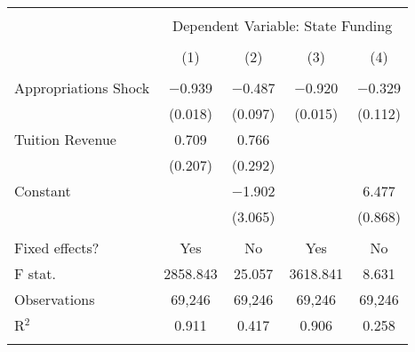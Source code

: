 
\begin{tabular}{@{\extracolsep{5pt}}lcccc} 
\\[-1.8ex]\hline 
\hline \\[-1.8ex] 
 & \multicolumn{4}{c}{Dependent Variable: State Funding} \\ 
\cline{2-5} 
\\[-1.8ex] & (1) & (2) & (3) & (4)\\ 
\hline \\[-1.8ex] 
 Appropriations Shock & $-$0.939 & $-$0.487 & $-$0.920 & $-$0.329 \\ 
  & (0.018) & (0.097) & (0.015) & (0.112) \\ 
  Tuition Revenue & 0.709 & 0.766 &  &  \\ 
  & (0.207) & (0.292) &  &  \\ 
  Constant &  & $-$1.902 &  & 6.477 \\ 
  &  & (3.065) &  & (0.868) \\ 
 \hline \\[-1.8ex] 
Fixed effects? & Yes & No & Yes & No \\ 
F stat. & 2858.843 & 25.057 & 3618.841 & 8.631 \\ 
Observations & 69,246 & 69,246 & 69,246 & 69,246 \\ 
R$^{2}$ & 0.911 & 0.417 & 0.906 & 0.258 \\ 
\hline 
\hline \\[-1.8ex] 
\end{tabular} 
